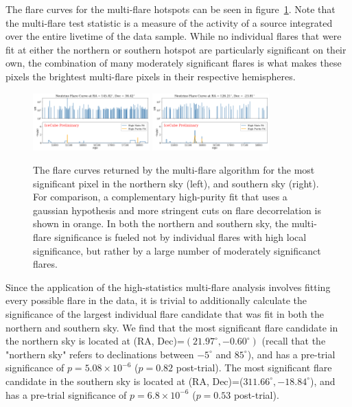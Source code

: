 The flare curves for the multi-flare hotspots can be seen in figure~\ref{fig:mfhotspots}. Note that the multi-flare test statistic is a measure of the activity of a source integrated over the entire livetime of the data sample. While no individual flares that were fit at either the northern or southern hotspot are particularly significant on their own, the combination of many moderately significant flares is what makes these pixels the brightest multi-flare pixels in their respective hemispheres. 

\begin{figure}[h]
\centering
\includegraphics[width=0.4\textwidth]{figs/fcurve_mf_north.png}
\includegraphics[width=0.4\textwidth]{figs/fcurve_mf_south.png}
\caption{The flare curves returned by the multi-flare algorithm for the most significant pixel in the northern sky (left), and southern sky (right). For comparison, a complementary high-purity fit that uses a gaussian hypothesis and more stringent cuts on flare decorrelation is shown in orange. In both the northern and southern sky, the multi-flare significance is fueled not by individual flares with high local significance, but rather by a large number of moderately significanct flares. }
\label{fig:mfhotspots}
\end{figure}

Since the application of the high-statistics multi-flare analysis involves fitting every possible flare in the data, it is trivial to additionally calculate the significance of the largest individual flare candidate that was fit in both the northern and southern sky. We find that the most significant flare candidate in the northern sky is located at (RA, Dec)=$(21.97^{\circ}, -0.60^{\circ})$ (recall that the "northern sky" refers to declinations between $-5^{\circ}$ and $85^{\circ}$), and has a pre-trial significance of $p=5.08\times10^{-6}$ ($p=0.82$ post-trial). The most significant flare candidate in the southern sky is located at (RA, Dec)=($311.66^{\circ}, -18.84^{\circ}$), and has a pre-trial significance of $p=6.8\times10^{-6}$ ($p=0.53$ post-trial). 

